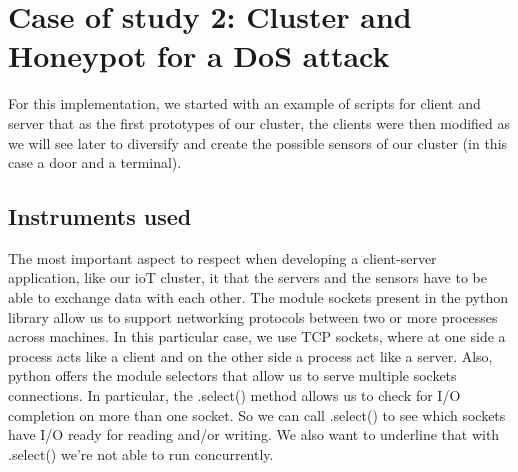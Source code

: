 \section{Case of study 2: Cluster and Honeypot for a DoS attack}

For this implementation, we started with an example of scripts for client and server that as the first prototypes of our cluster, the clients were then modified as we will see later to diversify and create the possible sensors of our cluster (in this case a door and a terminal).
\\

\subsection{Instruments used}
The most important aspect
to respect when developing a client-server application, like our ioT cluster, it that the servers and the sensors have to be able to exchange data
with each other. The module sockets present in the python library allow us to support networking protocols between two or more processes across machines. In this particular case, we use TCP sockets, where at one side a process acts like a client and on the other side a process act like a server. Also, python offers the module selectors that allow us to serve multiple sockets connections. In particular, the .select() method allows us to check for I/O completion on more than one socket. So we can call .select() to see which sockets have I/O ready for reading and/or writing. We also want to underline that with .select() we’re not able to run concurrently.

